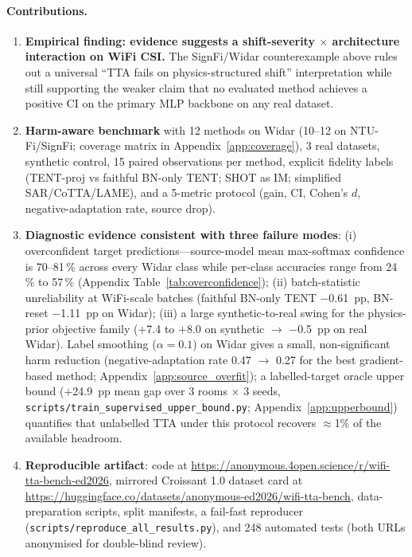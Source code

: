 \paragraph{Contributions.}
\begin{enumerate}
    \item \textbf{Empirical finding: evidence suggests a shift-severity $\times$ architecture interaction on WiFi CSI.} The SignFi/Widar counterexample above rules out a universal ``TTA fails on physics-structured shift'' interpretation while still supporting the weaker claim that no evaluated method achieves a positive CI on the primary MLP backbone on any real dataset.
    \item \textbf{Harm-aware benchmark} with 12 methods on Widar (10--12 on NTU-Fi/SignFi; coverage matrix in Appendix~\ref{app:coverage}), 3 real datasets, synthetic control, 15 paired observations per method, explicit fidelity labels (TENT-proj vs faithful BN-only TENT; SHOT as IM; simplified SAR/CoTTA/LAME), and a 5-metric protocol (gain, CI, Cohen's $d$, negative-adaptation rate, source drop).
    \item \textbf{Diagnostic evidence consistent with three failure modes}: (i) overconfident target predictions---source-model mean max-softmax confidence is 70--81\,\% across every Widar class while per-class accuracies range from 24\,\% to 57\,\% (Appendix Table~\ref{tab:overconfidence}); (ii) batch-statistic unreliability at WiFi-scale batches (faithful BN-only TENT $-$0.61~pp, BN-reset $-$1.11~pp on Widar); (iii) a large synthetic-to-real swing for the physics-prior objective family ($+$7.4 to $+$8.0 on synthetic $\to$ $-$0.5~pp on real Widar). Label smoothing ($\alpha{=}0.1$) on Widar gives a small, non-significant harm reduction (negative-adaptation rate 0.47 $\to$ 0.27 for the best gradient-based method; Appendix~\ref{app:source_overfit}); a labelled-target oracle upper bound ($+$24.9~pp mean gap over 3 rooms $\times$ 3 seeds, \texttt{scripts/train\_supervised\_upper\_bound.py}; Appendix~\ref{app:upperbound}) quantifies that unlabelled TTA under this protocol recovers $\approx$1\% of the available headroom.
    \item \textbf{Reproducible artifact}: code at \url{https://anonymous.4open.science/r/wifi-tta-bench-ed2026}, mirrored Croissant 1.0 dataset card at \url{https://huggingface.co/datasets/anonymous-ed2026/wifi-tta-bench}, data-preparation scripts, split manifests, a fail-fast reproducer (\texttt{scripts/reproduce\_all\_results.py}), and 248 automated tests (both URLs anonymised for double-blind review).
\end{enumerate}
